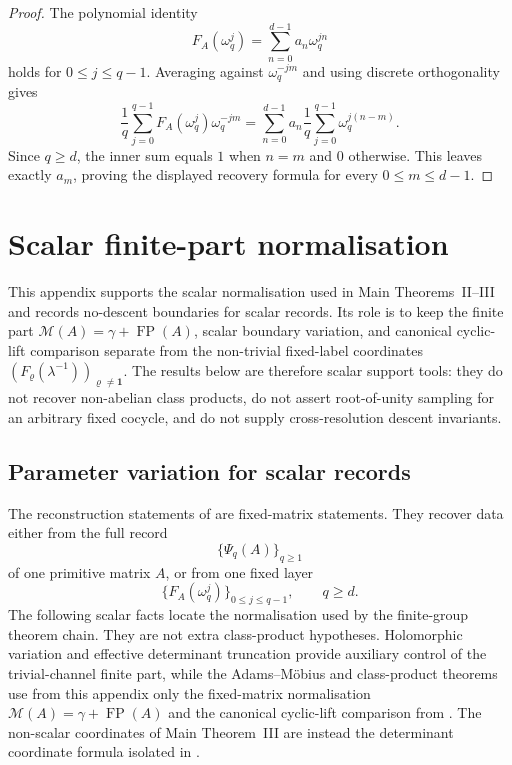 \documentclass[11pt,a4paper]{amsart}
\theoremstyle{plain}
\theoremstyle{definition}
\theoremstyle{remark}
\DeclareMathOperator{\FP}{FP}
\begin{document}
\begin{proof}
  The polynomial identity
  \[
    F_A(\omega_q^j)=\sum_{n=0}^{d-1}a_n\omega_q^{jn}
  \]
  holds for \(0\le j\le q-1\). Averaging against
  \(\omega_q^{-jm}\) and using discrete orthogonality gives
  \[
    \frac{1}{q}\sum_{j=0}^{q-1}
      F_A(\omega_q^j)\omega_q^{-jm}
    =
    \sum_{n=0}^{d-1}a_n
      \frac{1}{q}\sum_{j=0}^{q-1}\omega_q^{j(n-m)}.
  \]
  Since \(q\ge d\), the inner sum equals \(1\) when \(n=m\) and \(0\)
  otherwise. This leaves exactly \(a_m\), proving the displayed recovery
  formula for every \(0\le m\le d-1\).
\end{proof}

\section{Scalar finite-part normalisation}
\label{app:scalar-boundaries}

This appendix supports the scalar normalisation used in Main Theorems~II--III
and records no-descent boundaries for scalar records.  Its role is to keep the
finite part \(\mathcal M(A)=\gamma+\FP(A)\), scalar boundary variation, and
canonical cyclic-lift comparison separate from the non-trivial fixed-label
coordinates \((F_\varrho(\lambda^{-1}))_{\varrho\ne\mathbf1}\).  The results
below are therefore scalar support tools: they do not recover non-abelian class
products, do not assert root-of-unity sampling for an arbitrary fixed cocycle,
and do not supply cross-resolution descent invariants.

\subsection{Parameter variation for scalar records}
\label{app:record-boundary}

The reconstruction statements of  are fixed-matrix
statements. They recover data either from the full record
\[
  \{\Psi_q(A)\}_{q\ge1}
\]
of one primitive matrix \(A\), or from one fixed layer
\[
  \{F_A(\omega_q^j)\}_{0\le j\le q-1},
  \qquad q\ge d .
\]
The following scalar facts locate the normalisation used by the finite-group theorem chain.  They are not extra class-product hypotheses.  Holomorphic variation and effective determinant
truncation provide auxiliary control of the trivial-channel finite part,
while the Adams--M\"obius and class-product theorems use from this appendix
only the fixed-matrix normalisation \(\mathcal M(A)=\gamma+\FP(A)\) and the
canonical cyclic-lift comparison from .  The
non-scalar coordinates of Main Theorem~III are instead the determinant
coordinate formula isolated in
.
\end{document}
